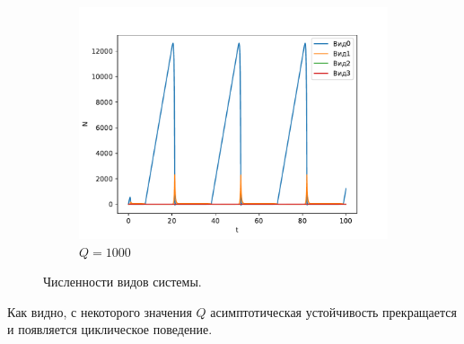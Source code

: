 \begin{figure}[H]
\begin{subfigure}[t]{.3\linewidth}
        \includegraphics[width=\textwidth]{pictures/exp_flow/exp2_Q1000.pdf}
        \caption{\(Q = 1000\)}
    \end{subfigure}
\caption{Численности видов системы.}  \label{fig:flow_exp2_q3}
\end{figure}

Как видно, с некоторого значения \(Q\) асимптотическая устойчивость прекращается и появляется циклическое поведение.